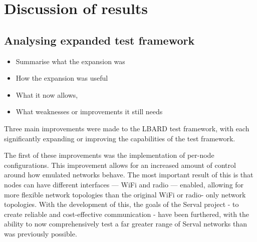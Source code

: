 
\chapter{Discussion of results} %

\label{Chapter7} %

\section{Analysing expanded test framework}
\begin{itemize}
    \item Summarise what the expansion was
    \item How the expansion was useful
    \item What it now allows, 
    \item What weaknesses or improvements it still needs
\end{itemize}


Three main improvements were made to the LBARD test framework, with each significantly expanding or improving the capabilities of the test framework.

The first of these improvements was the implementation of per-node configurations.
This improvement allows for an increased amount of control around how emulated networks behave.
The most important result of this is that nodes can have different interfaces — WiFi and radio — enabled, allowing for more flexible network topologies than the original WiFi or radio- only network topologies.
With the development of this, the goals of the Serval project - to create reliable and cost-effective communication - have been furthered, with the ability to now comprehensively test a far greater range of Serval networks than was previously possible.

